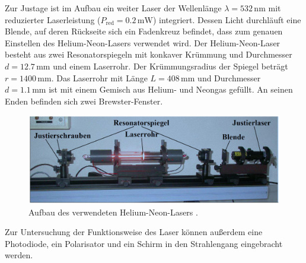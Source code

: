 Zur Justage ist im Aufbau ein weiter Laser der Wellenlänge $\lambda = 532 \, \si{\nano\meter}$ mit reduzierter 
Laserleistung ($P_\text{red} = 0.2 \, \si{\milli\watt}$) integriert. Dessen Licht durchläuft eine Blende, auf deren Rückseite sich ein Fadenkreuz befindet, 
dass zum genauen Einstellen des Helium-Neon-Lasers verwendet wird.
Der Helium-Neon-Laser besteht aus zwei Resonatorspiegeln mit konkaver Krümmung und Durchmesser $d = 12.7 \, \si{\milli\meter}$ und einem Laserrohr.
Der Krümmungsradius der Spiegel beträgt $r = 1400 \, \si{\milli\meter}$. Das Laserrohr mit Länge $L = 408 \, \si{\milli\meter}$
und Durchmesser $d = 1.1 \, \si{\milli\meter}$ ist mit einem Gemisch aus Helium- und Neongas gefüllt. An seinen Enden 
befinden sich zwei Brewster-Fenster.
\FloatBarrier
\begin{figure}[h]
\centering
\includegraphics[width=\textwidth]{aufbau.png}
\caption{Aufbau des verwendeten Helium-Neon-Lasers \cite{quelle01}.}
\label{fig:dfig1}
\end{figure}
\FloatBarrier
\noindent
Zur Untersuchung der Funktionsweise des Laser können außerdem eine Photodiode, ein Polarisator und ein Schirm
in den Strahlengang eingebracht werden. 

